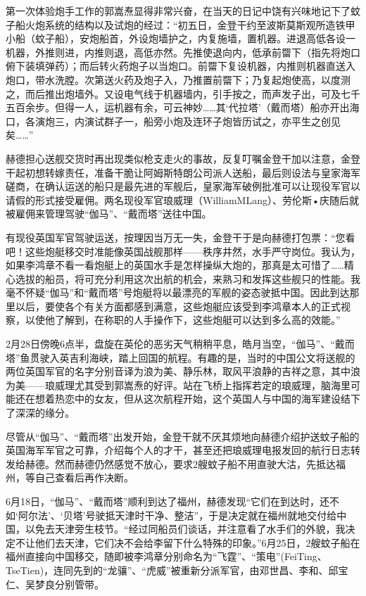 \documentclass[12pt,UTF8]{ctexbook}
\begin{document}
第一次体验炮手工作的郭嵩焘显得非常兴奋，在当天的日记中饶有兴味地记下了蚊子船火炮系统的结构以及试炮的经过：“初五日，金登干约至波斯莫斯观所造铁甲小船（蚊子船），安炮船首，外设炮墙护之，内复施墙，置机器。进退高低各设一机器，外推则进，内推则退，高低亦然。先推使退向内，低承前罶下（指先将炮口俯下装填弹药）；而后转火药炮子以当炮口。前罶下复设机器，内推则机器直送入炮口，带水洗膛。次第送火药及炮子入，乃推置前罶下；乃复起炮使高，以度测之，而后推出炮墙外。又设电气线于机器墙内，引手按之，而声发子出，可及七千五百余步。但得一人，运机器有余，可云神妙……其‘代拉塔’（戴而塔）船亦开出海口，各演炮三，内演试群子一，船旁小炮及连环子炮皆历试之，亦平生之创见矣……”

赫德担心送舰交货时再出现类似枪支走火的事故，反复叮嘱金登干加以注意，金登干起初想转嫁责任，准备干脆让阿姆斯特朗公司派人送船，最后则设法与皇家海军磋商，在确认运送的船只是最先进的军舰后，皇家海军破例批准可以让现役军官以请假的形式接受雇佣。两名现役军官琅威理（WilliamMLang）、劳伦斯•庆随后就被雇佣来管理驾驶“伽马”、“戴而塔”送往中国。

有现役英国军官驾驶运送，按理因当万无一失，金登干于是向赫德打包票：“您看吧！这些炮艇移交时准能像英国战舰那样——秩序井然，水手严守岗位。我认为，如果李鸿章不看一看炮艇上的英国水手是怎样操纵大炮的，那真是太可惜了……精心选拔的船员，将可充分利用这次出航的机会，来熟习和发挥这些舰只的性能。我毫不怀疑“伽马”和“戴而塔”号炮艇将以最漂亮的军舰的姿态驶抵中国。因此到达那里以后，要使各个有关方面都感到满意，这些炮艇应该受到李鸿章本人的正式视察，以使他了解到，在称职的人手操作下，这些炮艇可以达到多么高的效能。”

2月28日傍晚6点半，盘旋在英伦的恶劣天气稍稍平息，皓月当空，“伽马”、“戴而塔”鱼贯驶入英吉利海峡，踏上回国的航程。有趣的是，当时的中国公文将送舰的两位英国军官的名字分别音译为浪为美、静乐林，取风平浪静的吉祥之意，其中浪为美——琅威理尤其受到郭嵩焘的好评。站在飞桥上指挥若定的琅威理，脑海里可能还在想着热恋中的女友，但从这次航程开始，这个英国人与中国的海军建设结下了深深的缘分。

尽管从“伽马”、“戴而塔”出发开始，金登干就不厌其烦地向赫德介绍护送蚊子船的英国海军军官之可靠，介绍每个人的才干，甚至还把琅威理电报发回的航行日志转发给赫德。然而赫德仍然感觉不放心，要求2艘蚊子船不用直驶大沽，先抵达福州，等自己查看后再作决断。

6月18日，“伽马”、“戴而塔”顺利到达了福州，赫德发现“它们在到达时，还不如‘阿尔法’、‘贝塔’号驶抵天津时干净、整洁”，于是决定就在福州就地交付给中国，以免去天津旁生枝节。“经过同船员们谈话，并注意看了水手们的外貌，我决定不让他们去天津，它们决不会给李留下什么特殊的印象。”6月25日，2艘蚊子船在福州直接向中国移交，随即被李鸿章分别命名为“飞霆”、“策电”(FeiTing、TseTien)，连同先到的“龙骧”、“虎威”被重新分派军官，由邓世昌、李和、邱宝仁、吴梦良分别管带。
\end{document}
